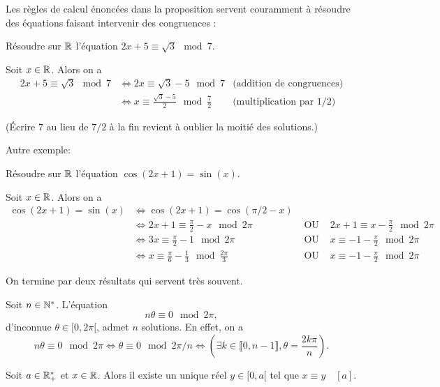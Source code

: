 Les règles de calcul énoncées dans la proposition servent couramment à résoudre des équations faisant intervenir des congruences :
\begin{exercice}
Résoudre sur $\mathbb{R}$ l'équation $2x+5\equiv \sqrt 3 \mod 7$.
\begin{red}
Soit $x\in \mathbb{R}$. Alors on a 
\begin{align*}
2x+5\equiv \sqrt 3 \mod 7 
&\iff 2x\equiv \sqrt 3 - 5 \mod 7  & \text{(addition de congruences)}\\
&\iff x\equiv \frac{\sqrt3-5}{2} \mod{\frac72} &\text{(multiplication par $1/2$)}
\end{align*}
\end{red}
(Écrire $7$ au lieu de $7/2$ à la fin revient à oublier la moitié des solutions.)
\end{exercice}
Autre exemple:
\begin{exercice}
Résoudre sur $\mathbb{R}$ l'équation $\cos(2x+1)=\sin(x)$.
\begin{red}
Soit $x\in \mathbb{R}$. Alors on a 
\begin{align*}
\cos(2x+1)=\sin(x) 
&\iff \cos(2x+1)=\cos(\pi/2-x)  &  & \\
&\iff 2x+1\equiv \frac{\pi}{2}-x \mod 2\pi &\text{ OU }&  2x+1\equiv x-\frac{\pi}{2} \mod 2\pi   \\
&\iff 3x\equiv \frac{\pi}{2}-1 \mod 2\pi &\text{ OU }&  x\equiv -1-\frac{\pi}{2} \mod 2\pi   \\
&\iff x\equiv \frac{\pi}{6}-\frac13 \mod{\frac{2\pi}{3}} &\text{ OU }&  x\equiv -1-\frac{\pi}{2} \mod 2\pi 
\end{align*}
\end{red}
\end{exercice}


On termine par deux résultats qui servent très souvent.

\begin{exemple}
Soit $n \in \mathbb{N}^*$. L'équation 
\[n\theta \equiv 0\mod2\pi,\]
d'inconnue $\theta \in [0,2\pi[$, admet $n$ solutions. En effet, on a 
\[n\theta \equiv 0\mod 2\pi \iff \theta \equiv 0\mod 2\pi/n \iff \left(\exists k \in \llbracket 0,n-1 \rrbracket, \theta = \frac{2k\pi}{n}\right).\]
\end{exemple}




\begin{proposition}
Soit $a\in\mathbb{R}_+^*$ et $x \in \mathbb{R}$.
Alors il existe un unique réel $y \in[0,a[ $ tel que $x \equiv y\quad [a]$.
\end{proposition}

